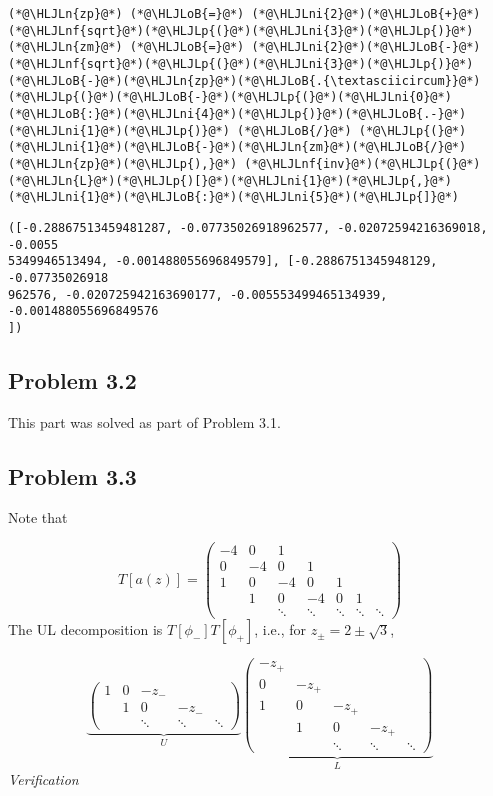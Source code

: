 \documentclass[12pt,a4paper]{article}
\newcommand{\HLJLn}[1]{#1}
\newcommand{\HLJLnf}[1]{\textcolor[RGB]{66,102,213}{#1}}
\newcommand{\HLJLni}[1]{\textcolor[RGB]{59,151,46}{#1}}
\newcommand{\HLJLoB}[1]{\textcolor[RGB]{102,102,102}{\textbf{#1}}}
\newcommand{\HLJLp}[1]{#1}
\def\sopmatrix#1{ \begin{pmatrix}#1\end{pmatrix} }
\begin{document}
\begin{lstlisting}
(*@\HLJLn{zp}@*) (*@\HLJLoB{=}@*) (*@\HLJLni{2}@*)(*@\HLJLoB{+}@*)(*@\HLJLnf{sqrt}@*)(*@\HLJLp{(}@*)(*@\HLJLni{3}@*)(*@\HLJLp{)}@*)
(*@\HLJLn{zm}@*) (*@\HLJLoB{=}@*) (*@\HLJLni{2}@*)(*@\HLJLoB{-}@*)(*@\HLJLnf{sqrt}@*)(*@\HLJLp{(}@*)(*@\HLJLni{3}@*)(*@\HLJLp{)}@*)
(*@\HLJLoB{-}@*)(*@\HLJLn{zp}@*)(*@\HLJLoB{.{\textasciicircum}}@*)(*@\HLJLp{(}@*)(*@\HLJLoB{-}@*)(*@\HLJLp{(}@*)(*@\HLJLni{0}@*)(*@\HLJLoB{:}@*)(*@\HLJLni{4}@*)(*@\HLJLp{)}@*)(*@\HLJLoB{.-}@*)(*@\HLJLni{1}@*)(*@\HLJLp{)}@*) (*@\HLJLoB{/}@*) (*@\HLJLp{(}@*)(*@\HLJLni{1}@*)(*@\HLJLoB{-}@*)(*@\HLJLn{zm}@*)(*@\HLJLoB{/}@*)(*@\HLJLn{zp}@*)(*@\HLJLp{),}@*) (*@\HLJLnf{inv}@*)(*@\HLJLp{(}@*)(*@\HLJLn{L}@*)(*@\HLJLp{)[}@*)(*@\HLJLni{1}@*)(*@\HLJLp{,}@*)(*@\HLJLni{1}@*)(*@\HLJLoB{:}@*)(*@\HLJLni{5}@*)(*@\HLJLp{]}@*)
\end{lstlisting}

\begin{lstlisting}
([-0.28867513459481287, -0.07735026918962577, -0.02072594216369018, -0.0055
5349946513494, -0.001488055696849579], [-0.2886751345948129, -0.07735026918
962576, -0.020725942163690177, -0.005553499465134939, -0.001488055696849576
])
\end{lstlisting}


\subsection{Problem 3.2}
This part was solved as part of Problem 3.1.

\subsection{Problem 3.3}
Note that

\[
T[a(z)] = \sopmatrix{
-4 & 0 & 1 \\
0 & -4 & 0 & 1 \\
1 & 0 & -4 & 0 & 1 \\
& 1& 0 & -4 & 0 & 1 \\
&&\ddots &\ddots &\ddots &\ddots &\ddots
}
\]
The UL decomposition is $T[\phi_-] T[\phi_+]$, i.e., for $z_{\pm} = 2 \pm \sqrt3$,

\[
\underbrace{\sopmatrix{
1 & 0 & -z_- \\
& 1 & 0 & -z_- \\
&&\ddots & \ddots & \ddots
}}_U
\underbrace{\sopmatrix{-z_+ \\
0 & -z_+ \\
1 & 0 & -z_+ \\
& 1 & 0 & -z_+ \\
&&\ddots & \ddots & \ddots
}}_L
\]
\emph{Verification}
\end{document}
